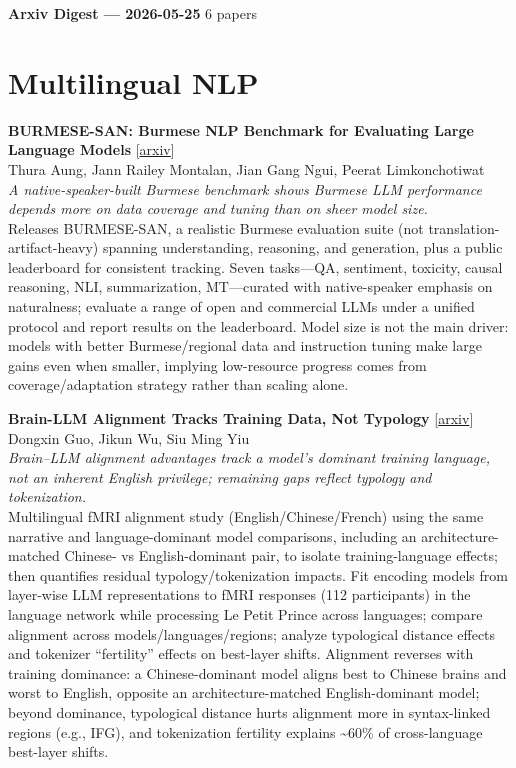 \documentclass[12pt,letterpaper]{article}
\begin{document}
{\footnotesize\textbf{Arxiv Digest --- 2026-05-25} \hfill 6 papers}

\smallskip

\section*{Multilingual NLP}

{\small\textbf{BURMESE-SAN: Burmese NLP Benchmark for Evaluating Large Language Models}} {\scriptsize[\href{https://arxiv.org/abs/2602.18788}{arxiv}]}\\
{\scriptsize Thura Aung, Jann Railey Montalan, Jian Gang Ngui, Peerat Limkonchotiwat}\\

{\small\textit{A native-speaker-built Burmese benchmark shows Burmese LLM performance depends more on data coverage and tuning than on sheer model size.}}\\[1pt]
{\footnotesize Releases BURMESE-SAN, a realistic Burmese evaluation suite (not translation-artifact-heavy) spanning understanding, reasoning, and generation, plus a public leaderboard for consistent tracking. Seven tasks---QA, sentiment, toxicity, causal reasoning, NLI, summarization, MT---curated with native-speaker emphasis on naturalness; evaluate a range of open and commercial LLMs under a unified protocol and report results on the leaderboard. Model size is not the main driver: models with better Burmese/regional data and instruction tuning make large gains even when smaller, implying low-resource progress comes from coverage/adaptation strategy rather than scaling alone.}

\medskip

{\small\textbf{Brain-LLM Alignment Tracks Training Data, Not Typology}} {\scriptsize[\href{https://arxiv.org/abs/2605.23032}{arxiv}]}\\
{\scriptsize Dongxin Guo, Jikun Wu, Siu Ming Yiu}\\

{\small\textit{Brain--LLM alignment advantages track a model's dominant training language, not an inherent English privilege; remaining gaps reflect typology and tokenization.}}\\[1pt]
{\footnotesize Multilingual fMRI alignment study (English/Chinese/French) using the same narrative and language-dominant model comparisons, including an architecture-matched Chinese- vs English-dominant pair, to isolate training-language effects; then quantifies residual typology/tokenization impacts. Fit encoding models from layer-wise LLM representations to fMRI responses (112 participants) in the language network while processing Le Petit Prince across languages; compare alignment across models/languages/regions; analyze typological distance effects and tokenizer ``fertility'' effects on best-layer shifts. Alignment reverses with training dominance: a Chinese-dominant model aligns best to Chinese brains and worst to English, opposite an architecture-matched English-dominant model; beyond dominance, typological distance hurts alignment more in syntax-linked regions (e.g., IFG), and tokenization fertility explains \textasciitilde{}60\% of cross-language best-layer shifts.}
\end{document}

